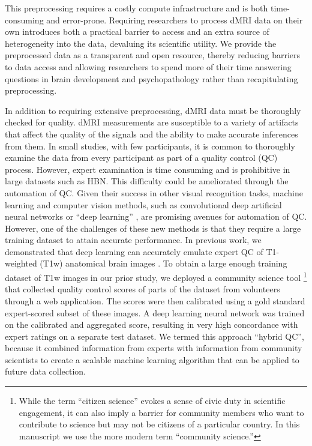 \documentclass[fleqn,10pt,inline]{wlscirep}
\begin{document}
This preprocessing requires a costly compute infrastructure and is both time-consuming and error-prone. Requiring researchers to process dMRI data on their own introduces both a practical barrier to access and an extra source of heterogeneity into the data, devaluing its scientific utility. We provide the preprocessed data as a transparent and open resource, thereby reducing barriers to data access and allowing researchers to spend more of their time answering questions in brain development and psychopathology rather than recapitulating preprocessing.

In addition to requiring extensive preprocessing, dMRI data must be thoroughly checked for quality. dMRI measurements are susceptible to a variety of artifacts that affect
the quality of the signals and the ability to make accurate inferences from
them. In small studies, with few participants, it is common to thoroughly
examine the data from every participant as part of a quality control (QC)
process. However, expert examination is time consuming and is prohibitive in large
datasets such as HBN. This difficulty could be ameliorated through the
automation of QC. Given their success in other visual recognition tasks, machine learning and computer vision methods, such as convolutional deep
artificial neural networks or ``deep learning'' \cite{lecun2015deep}, are
promising avenues for automation of QC. However, one of the challenges of these new
methods is that they require a large training dataset to attain accurate
performance. In previous work, we demonstrated that deep learning can accurately
emulate expert QC of T1-weighted (T1w) anatomical brain images
\cite{keshavan2019-er}. To obtain a large enough training dataset of T1w images
in our prior study, we deployed a community science tool
\footnote{%
    While the term ``citizen science'' evokes a sense of civic duty in
    scientific engagement, it can also imply a barrier for community members who
    want to contribute to science but may not be citizens of a particular
    country. In this manuscript we use the more modern term ``community
    science.''
}
that collected quality
control scores of parts of the dataset from volunteers through a web application.
The scores were then calibrated using a gold standard expert-scored subset of
these images. A deep learning neural network was trained on the calibrated and
aggregated score, resulting in very high concordance with expert ratings on a
separate test dataset. We termed this approach ``hybrid QC'', because it combined
information from experts with information from community scientists to create a
scalable machine learning algorithm that can be applied to future data
collection.
\end{document}
